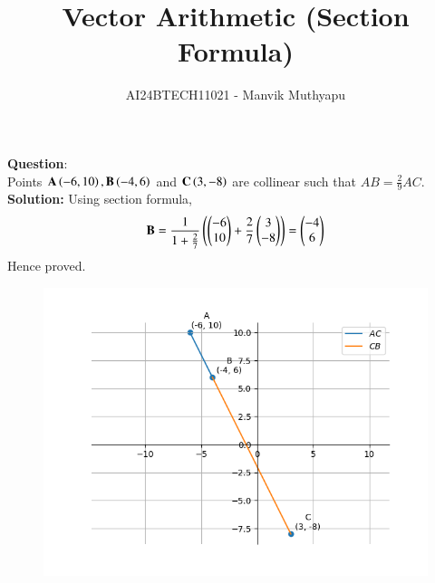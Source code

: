 \documentclass[journal,12pt,onecolumn]{IEEEtran}
\title{Vector Arithmetic (Section Formula)}
\author{AI24BTECH11021 - Manvik Muthyapu}
\theoremstyle{remark}
\begin{document}


\maketitle
\bigskip

\renewcommand{\thefigure}{\theenumi}
\renewcommand{\thetable}{\theenumi}

\textbf{Question}:\\
Points $\textbf{A}\left(-6,10\right),\textbf{B}\left(-4,6\right)$ and $\textbf{C}\left(3,-8\right)$ are collinear such that $AB = \frac{2}{9}AC$.\\
		
\textbf{Solution: }Using section formula,
	$$\textbf{B} = \frac{1}{1 + \frac{2}{7}}\left(\begin{pmatrix}-6\\10\end{pmatrix} + \frac{2}{7}\begin{pmatrix}3\\-8\end{pmatrix}\right) = \begin{pmatrix}-4\\6\end{pmatrix}$$
	Hence proved.

\begin{figure}[h!]
	\centering
	\includegraphics[width=0.7\linewidth]{figs/fig1.png}
\end{figure}
\end{document}
